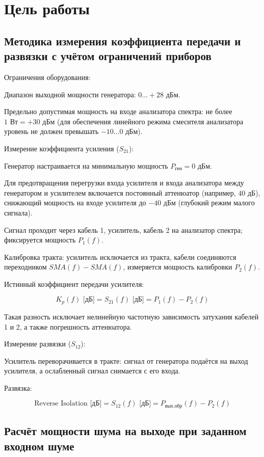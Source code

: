 \section{Цель работы}

\subsection {Методика измерения коэффициента передачи и развязки с учётом ограничений приборов}

Ограничения оборудования:

Диапазон выходной мощности генератора: $0 \dots +28\text{ дБм}$.

Предельно допустимая мощность на входе анализатора спектра: не более $1\text{ Вт} = +30\text{ дБм}$ (для обеспечения линейного режима смесителя анализатора уровень не должен превышать $-10 \dots 0\text{ дБм}$).

Измерение коэффициента усиления ($S_{21}$):

Генератор настраивается на минимальную мощность $P_{\text{ген}} = 0\text{ дБм}$.

Для предотвращения перегрузки входа усилителя и входа анализатора между генератором и усилителем включается постоянный аттенюатор (например, $40\text{ дБ}$), снижающий мощность на входе усилителя до $-40\text{ дБм}$ (глубокий режим малого сигнала).

Сигнал проходит через кабель 1, усилитель, кабель 2 на анализатор спектра; фиксируется мощность $P_1(f)$.

Калибровка тракта: усилитель исключается из тракта, кабели соединяются переходником $SMA(f)-SMA(f)$, измеряется мощность калибровки $P_2(f)$.

Истинный коэффициент передачи усилителя:


$$K_p(f)\text{ [дБ]} = S_{21}(f)\text{ [дБ]} = P_1(f) - P_2(f)$$


Такая разность исключает нелинейную частотную зависимость затухания кабелей 1 и 2, а также погрешность аттенюатора.

Измерение развязки ($S_{12}$):

Усилитель переворачивается в тракте: сигнал от генератора подаётся на выход усилителя, а ослабленный сигнал снимается с его входа.

Развязка:


$$\text{Reverse Isolation [дБ]} = S_{12}(f)\text{ [дБ]} = P_{\text{вых.обр}}(f) - P_2(f)$$

\subsection {Расчёт мощности шума на выходе при заданном входном шуме}

